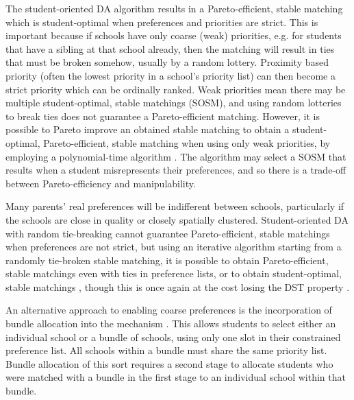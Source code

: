 \documentclass{article}
\begin{document}
\begin{multicols}{2}
The student-oriented DA algorithm results in a Pareto-efficient, stable matching which is student-optimal when preferences and priorities are strict. This is important because if schools have only coarse (weak) priorities, e.g. for students that have a sibling at that school already, then the matching will result in ties that must be broken somehow, usually by a random lottery. Proximity based priority (often the lowest priority in a school's priority list) can then become a strict priority which can be ordinally ranked. Weak priorities mean there may be multiple student-optimal, stable matchings (SOSM), and using random lotteries to break ties does not guarantee a Pareto-efficient matching. However, it is possible to Pareto improve an obtained stable matching to obtain a student-optimal, Pareto-efficient, stable matching when using only weak priorities, by employing a polynomial-time algorithm \cite{erdilWhatsMatterTieBreaking2008}. The algorithm may select a SOSM that results when a student misrepresents their preferences, and so there is a trade-off between Pareto-efficiency and manipulability. %

Many parents' real preferences will be indifferent between schools, particularly if the schools are close in quality or closely spatially clustered. Student-oriented DA with random tie-breaking cannot guarantee Pareto-efficient, stable matchings when preferences are not strict, but using an iterative algorithm starting from a randomly tie-broken stable matching, it is possible to obtain Pareto-efficient, stable matchings even with ties in preference lists, or to obtain student-optimal, stable matchings \cite{erdilTwosidedMatchingIndifferences2017}, though this is once again at the cost losing the DST property \cite{rothEconomicsMatchingStability1982}.

An alternative approach to enabling coarse preferences is the incorporation of bundle allocation into the mechanism \cite{huangBundledSchoolChoice2025}. This allows students to select either an individual school or a bundle of schools, using only one slot in their constrained preference list. All schools within a bundle must share the same priority list. Bundle allocation of this sort requires a second stage to allocate students who were matched with a bundle in the first stage to an individual school within that bundle.


\end{multicols}
\end{document}
